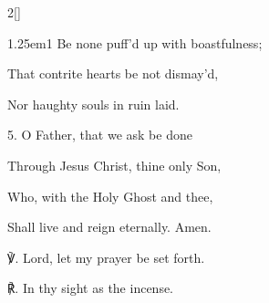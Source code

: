 \begin{paracol}{2}[]
\begin{hangparas}{1.25em}{1}
Be none puff'd up with boastfulness;

That contrite hearts be not dismay'd,

Nor haughty souls in ruin laid.\\

\vspace{-0.25\baselineskip}

5. O Father, that we ask be done

Through Jesus Christ, thine only Son,

Who, with the Holy Ghost and thee,

Shall live and reign eternally. Amen.\\
\end{hangparas}

℣. Lord, let my prayer be set forth.

℟. In thy sight as the incense.


\fussy
\end{paracol}


